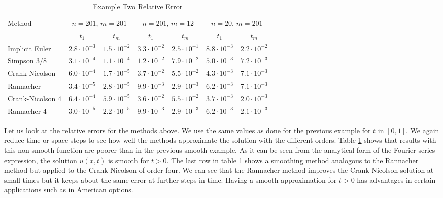 \documentclass[00main.tex]{subfiles}
\begin{document}
\begin{table}
  \centering
  \scriptsize
    \begin{tabular}{lcc|cc|cc}
    \multirow{2}{*}{Method} 
    & \multicolumn{2}{c}{$n=201$, $m=201$} 
    & \multicolumn{2}{c}{$n=201$, $m=12$} 
    & \multicolumn{2}{c}{$n=20$, $m=201$}\\
     & $t_1$ & $t_m$ & $t_1$ & $t_m$ & $t_1$ & $t_m$ \\ \hline
       Implicit Euler  
       & $2.8 \cdot 10^{-3}$ & $1.5 \cdot 10^{-2}$ 
       & $3.3 \cdot 10^{-2}$ & $2.5 \cdot 10^{-1}$ 
       & $8.8 \cdot 10^{-3}$ & $2.2 \cdot 10^{-2}$ \\
       Simpson 3/8  
       & $3.1 \cdot 10^{-4}$ & $1.1 \cdot 10^{-4}$ 
       & $1.2 \cdot 10^{-2}$ & $7.9 \cdot 10^{-2}$ 
       & $5.0 \cdot 10^{-3}$ & $7.2 \cdot 10^{-3}$ \\
       Crank-Nicolson  
       & $6.0 \cdot 10^{-4}$ & $1.7 \cdot 10^{-5}$ 
       & $3.7 \cdot 10^{-2}$ & $5.5 \cdot 10^{-2}$ 
       & $4.3 \cdot 10^{-3}$ & $7.1 \cdot 10^{-3}$ \\
       Rannacher  
       & $3.4 \cdot 10^{-5}$ & $2.8 \cdot 10^{-5}$ 
       & $9.9 \cdot 10^{-3}$ & $2.9 \cdot 10^{-3}$ 
       & $6.2 \cdot 10^{-3}$ & $7.1 \cdot 10^{-3}$ \\
       Crank-Nicolson 4  
       & $6.4 \cdot 10^{-4}$ & $5.9 \cdot 10^{-5}$ 
       & $3.6 \cdot 10^{-2}$ & $5.5 \cdot 10^{-2}$ 
       & $3.7 \cdot 10^{-3}$ & $2.0 \cdot 10^{-3}$ \\
       Rannacher 4  
       & $3.0 \cdot 10^{-5}$ & $2.2 \cdot 10^{-5}$ 
       & $9.9 \cdot 10^{-3}$ & $2.9 \cdot 10^{-3}$ 
       & $6.2 \cdot 10^{-3}$ & $2.1 \cdot 10^{-3}$ \\
    \end{tabular}%
    \caption{Example Two Relative Error}
  \label{example2_relerr}%
\end{table}%

Let us look at the relative errors for the methods above. We use the same values as done for the previous example for $t$ in $[0,1]$. We again reduce time or space steps to see how well the methods approximate the solution with the different orders. Table \ref{example2_relerr} shows that results with this non smooth function are poorer than in the previous smooth example. As it can be seen from the analytical form of the Fourier series expression, the solution $u(x,t)$ is smooth for $t>0$. The last row in table \ref{example2_relerr} shows a smoothing method analogous to the Rannacher method but applied to the Crank-Nicolson of order four. We can see that the Rannacher method improves the Crank-Nicolson solution at small times but it keeps about the same error at further steps in time. Having a smooth approximation for $t>0$ has advantages in certain applications such as in American options.
\end{document}
